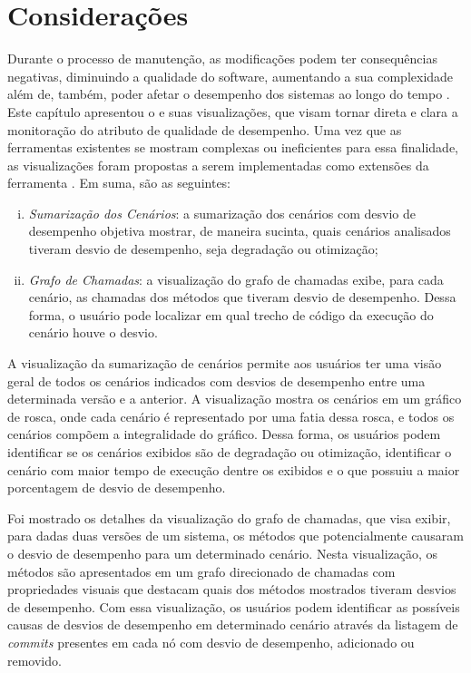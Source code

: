 \section{Considerações} \label{sec:consideracoes-cap3}

Durante o processo de manutenção, as modificações podem ter consequências negativas, diminuindo a qualidade do software, aumentando a sua complexidade além de, também, poder afetar o desempenho dos sistemas ao longo do tempo \cite{BeladyLaszloA.andLehman1976}\cite{LehmanMeirMandRamilJuanFandWernickPaulDandPerryDewayneEandTurski}\cite{Molyneaux2009}. Este capítulo apresentou o \textit{\toolName} e suas visualizações, que visam tornar direta e clara a monitoração do atributo de qualidade de desempenho. Uma vez que as ferramentas existentes se mostram complexas ou ineficientes para essa finalidade, as visualizações foram propostas a serem implementadas como extensões da ferramenta \textit{\perfMinerName}. Em suma, são as seguintes:
\begin{enumerate}[(i)]
   \item \textit{Sumarização dos Cenários}: a sumarização dos cenários com desvio de desempenho objetiva mostrar, de maneira sucinta, quais cenários analisados tiveram desvio de desempenho, seja degradação ou otimização;
   \item \textit{Grafo de Chamadas}: a visualização do grafo de chamadas exibe, para cada cenário, as chamadas dos métodos que tiveram desvio de desempenho. Dessa forma, o usuário pode localizar em qual trecho de código da execução do cenário houve o desvio.
\end{enumerate}

A visualização da sumarização de cenários permite aos usuários ter uma visão geral de todos os cenários indicados com desvios de desempenho entre uma determinada versão e a anterior. A visualização mostra os cenários em um gráfico de rosca, onde cada cenário é representado por uma fatia dessa rosca, e todos os cenários compõem a integralidade do gráfico. Dessa forma, os usuários podem identificar se os cenários exibidos são de degradação ou otimização, identificar o cenário com maior tempo de execução dentre os exibidos e o que possuiu a maior porcentagem de desvio de desempenho.

Foi mostrado os detalhes da visualização do grafo de chamadas, que visa exibir, para dadas duas versões de um sistema, os métodos que potencialmente causaram o desvio de desempenho para um determinado cenário. Nesta visualização, os métodos são apresentados em um grafo direcionado de chamadas com propriedades visuais que destacam quais dos métodos mostrados tiveram desvios de desempenho. Com essa visualização, os usuários podem identificar as possíveis causas de desvios de desempenho em determinado cenário através da listagem de \textit{commits} presentes em cada nó com desvio de desempenho, adicionado ou removido.